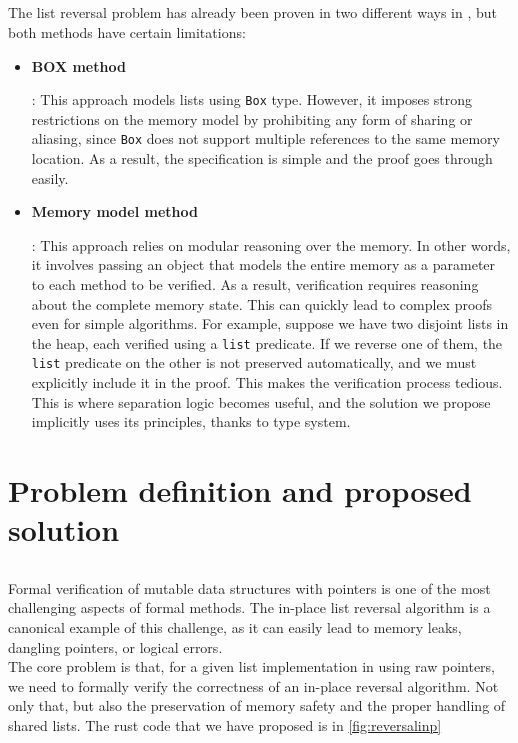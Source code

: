 \documentclass[11pt,a4paper]{article}
\begin{document}
\subsection{}
The list reversal problem has already been proven in two different ways in \creusot{}, but both methods have certain limitations:

\begin{itemize}
\item \hypertarget{BOXmeth}{\textbf{\textsc{BOX} method}}: This approach models lists using \rust{} \texttt{Box} type. However, it imposes strong restrictions on the memory model by prohibiting any form of sharing or aliasing, since \texttt{Box} does not support multiple references to the same memory location. As a result, the specification is simple and the proof goes through easily.
\item \hypertarget{MEMmodel}{\textbf{Memory model method}}: This approach relies on modular reasoning over the memory. In other words, it involves passing an object that models the entire memory as a parameter to each method to be verified. As a result, verification requires reasoning about the complete memory state. This can quickly lead to complex proofs even for simple algorithms. For example, suppose we have two disjoint lists in the heap, each verified using a \texttt{list} predicate. If we reverse one of them, the \texttt{list} predicate on the other is not preserved automatically, and we must explicitly include it in the proof. This makes the verification process tedious. This is where separation logic becomes useful, and the solution we propose implicitly uses its principles, thanks to \rust{} type system.
\end{itemize}

\section{Problem definition and proposed solution}
\subsection{}
Formal verification of mutable data structures with pointers is one of the most challenging aspects of formal methods. The in-place list reversal algorithm is a canonical example of this challenge, as it can easily lead to memory leaks, dangling pointers, or logical errors.\\
The core problem is that, for a given list implementation in \rust{} using raw pointers, we need to formally verify the correctness of an in-place reversal algorithm. Not only that, but also the preservation of memory safety and the proper handling of shared lists. The rust code that we have proposed is in \autoref{fig:reversalinp}
\end{document}
